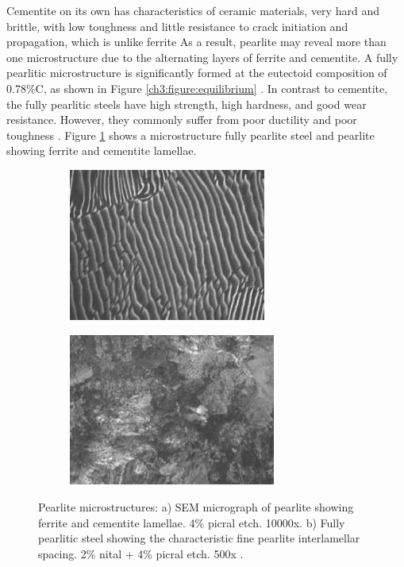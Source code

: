 \documentclass[12pt]{report}
\begin{document}
Cementite on its own has characteristics of ceramic materials, very hard and brittle, with low toughness and little resistance to crack initiation and propagation, which is unlike ferrite \cite{bajaj2020steels} As a result, pearlite may reveal more than one microstructure due to the alternating layers of ferrite and cementite. A fully pearlitic microstructure is significantly formed at the eutectoid composition of 0.78\%C, as shown in Figure \ref{ch3:figure:equilibrium} \cite{molabe2018determining}. In contrast to cementite, the fully pearlitic steels have high strength, high hardness, and good wear resistance. However, they commonly suffer from poor ductility and poor toughness \cite{molabe2018determining}. Figure \ref{ch3:figure:pearlite:microstructures} shows a microstructure fully pearlite steel and pearlite showing ferrite and cementite lamellae.

\begin{figure}[H]

\centering
\begin{subfigure}{.45\textwidth}
    \centering
    \includegraphics[height=5cm,width=\textwidth]{ferrite_and_cementite_lamellae_micrograph.jpg}
    \caption{}
\end{subfigure}
\begin{subfigure}{.45\textwidth}
    \centering
    \includegraphics[height=5cm,width=\textwidth]{fully_pearlitic_steel.jpg}
    \caption{}
\end{subfigure}

\caption{Pearlite microstructures:  a) SEM micrograph of pearlite showing ferrite and cementite lamellae. 4\% picral etch. 10000x. b) Fully pearlitic steel showing the characteristic fine pearlite interlamellar spacing. 2\% nital + 4\% picral etch. 500x \cite{molabe2018determining}.}
\label{ch3:figure:pearlite:microstructures}
\end{figure}
\end{document}
